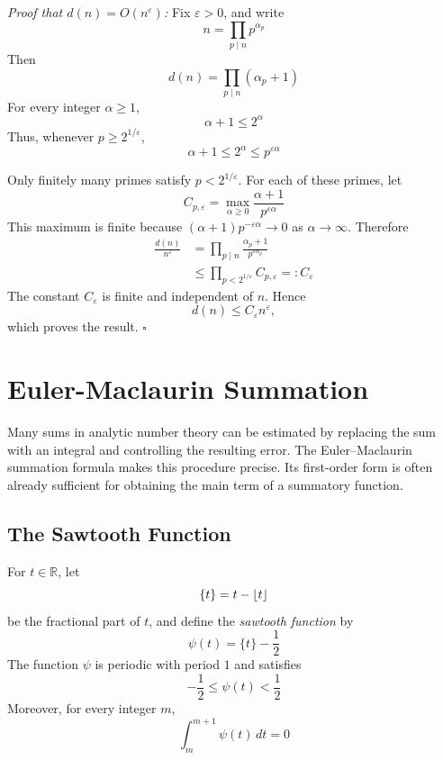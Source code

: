 \documentclass[a4paper,11pt,abstracton]{scrartcl}
\DeclarePairedDelimiter{\floor}{\lfloor}{\rfloor}
\theoremstyle{dotlessP}
\theoremstyle{dotlessS}
\theoremstyle{remark}
\theoremstyle{definition}
\begin{document}
\begin{claim_box}
\textit{Proof that $d(n)=O(n^{\varepsilon})$:}
Fix $\varepsilon>0$, and write
\[
    n=\prod_{p\mid n}p^{\alpha_p}
\]
Then
\[
    d(n)=\prod_{p\mid n}(\alpha_p+1)
\]
For every integer $\alpha\geq1$,
\[
    \alpha+1\leq2^{\alpha}
\]
Thus, whenever $p\geq2^{1/\varepsilon}$,
\[
    \alpha+1
      \leq2^{\alpha}
      \leq p^{\varepsilon\alpha}
\]

Only finitely many primes satisfy $p<2^{1/\varepsilon}$. For each of
these primes, let
\[
    C_{p,\varepsilon}
      =\max_{\alpha\geq0}
        \frac{\alpha+1}{p^{\varepsilon\alpha}}
\]
This maximum is finite because
$(\alpha+1)p^{-\varepsilon\alpha}\to0$ as $\alpha\to\infty$.
Therefore
\begin{align*}
    \frac{d(n)}{n^{\varepsilon}}
      &=\prod_{p\mid n}
        \frac{\alpha_p+1}{p^{\varepsilon\alpha_p}}\\
      &\leq\prod_{p<2^{1/\varepsilon}}C_{p,\varepsilon}
       =:C_{\varepsilon}
\end{align*}
The constant $C_{\varepsilon}$ is finite and independent of $n$.
Hence
\[
    d(n)\leq C_{\varepsilon}n^{\varepsilon},
\]
which proves the result.
\hfill$\square$
\end{claim_box}

\section{Euler-Maclaurin Summation}

Many sums in analytic number theory can be estimated by replacing the
sum with an integral and controlling the resulting error. The
Euler--Maclaurin summation formula makes this procedure precise. Its
first-order form is often already sufficient for obtaining the main
term of a summatory function.

\subsection{The Sawtooth Function}

\begin{definition_box}
For $t\in\mathbb{R}$, let
\[
    \{t\}=t-\floor{t}
\]
be the fractional part of $t$, and define the \emph{sawtooth function}
by
\[
    \psi(t)=\{t\}-\frac12
\]
The function $\psi$ is periodic with period $1$ and satisfies
\[
    -\frac12\leq\psi(t)<\frac12
\]
Moreover, for every integer $m$,
\[
    \int_m^{m+1}\psi(t)\,dt=0
\]
\end{definition_box}
\end{document}
